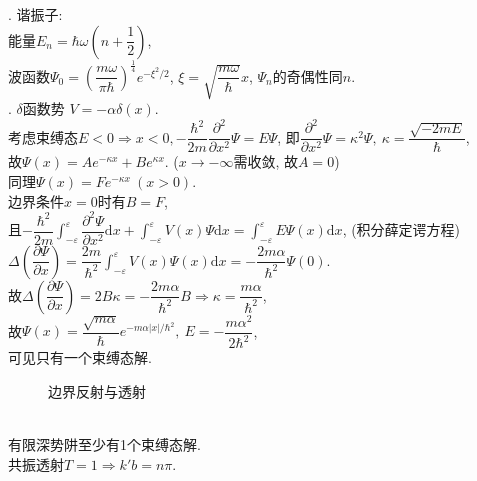 \documentclass[12pt, 
]{article}
\begin{document}
. 谐振子:
~\\\phantom{~~~~~~}能量$E_n=\hbar\omega(n+\dfrac{1}{2})$,
~\\\phantom{~~~~~~}波函数$\varPsi_0=\left(\dfrac{m\omega}{\pi\hbar}\right)^{\frac{1}{4}}e^{-\xi^2/2}$, $\xi=\sqrt{\dfrac{m\omega}{\hbar}}x$, $\varPsi_n$的奇偶性同$n$.
~\\

. $\delta$函数势 $V=-\alpha\delta(x)$.
~\\\phantom{~~~~}考虑束缚态$E<0\Rightarrow x<0, -\dfrac{\hbar^2}{2m}\dfrac{\partial^2}{\partial x^2}\varPsi=E\varPsi$, 即$\dfrac{\partial^2}{\partial x^2}\varPsi=\kappa^2\varPsi,~\kappa=\dfrac{\sqrt{-2mE}}{\hbar}$,
~\\\phantom{~~~~}故$\varPsi(x)=Ae^{-\kappa x}+Be^{\kappa x}$. ($x\rightarrow-\infty$需收敛, 故$A=0$)
~\\\phantom{~~~~}同理$\varPsi(x)=Fe^{-\kappa x}~(x>0)$.
~\\\phantom{~~~~}边界条件$x=0$时有$B=F$,
~\\\phantom{~~~~}且$-\dfrac{\hbar^2}{2m}\displaystyle\int_{-\varepsilon}^{\varepsilon}\dfrac{\partial^2\varPsi}{\partial x^2}\mathrm{d}x+\int_{-\varepsilon}^{\varepsilon}V(x)\varPsi\mathrm{d}x=\int_{-\varepsilon}^{\varepsilon}E\varPsi(x)\mathrm{d}x$, (积分薛定谔方程)
~\\\phantom{~~~~~}$\Delta\left(\dfrac{\partial\varPsi}{\partial x}\right)=\dfrac{2m}{\hbar^2}\displaystyle\int_{-\varepsilon}^{\varepsilon}V(x)\varPsi(x)\mathrm{d}x=-\dfrac{2m\alpha}{\hbar^2}\varPsi(0)$.
~\\\phantom{~~~~}故$\Delta\left(\dfrac{\partial\varPsi}{\partial x}\right)=2B\kappa=-\dfrac{2m\alpha}{\hbar^2}B\Rightarrow\kappa=\dfrac{m\alpha}{\hbar^2}$,
~\\\phantom{~~~~}故$\varPsi(x)=\dfrac{\sqrt{m\alpha}}{\hbar}e^{-m\alpha |x|/\hbar^2},~E=-\dfrac{m\alpha^2}{2\hbar^2}$,
~\\\phantom{~~~~}可见只有一个束缚态解.

\begin{figure}
\vspace{-3cm}
\label{fg:16}
\caption{边界反射与透射}
\end{figure}
~\\\phantom{~~~~}有限深势阱至少有1个束缚态解.
~\\\phantom{~~~~}共振透射$T=1\Rightarrow k'b=n\pi$.
~\\
\end{document}
